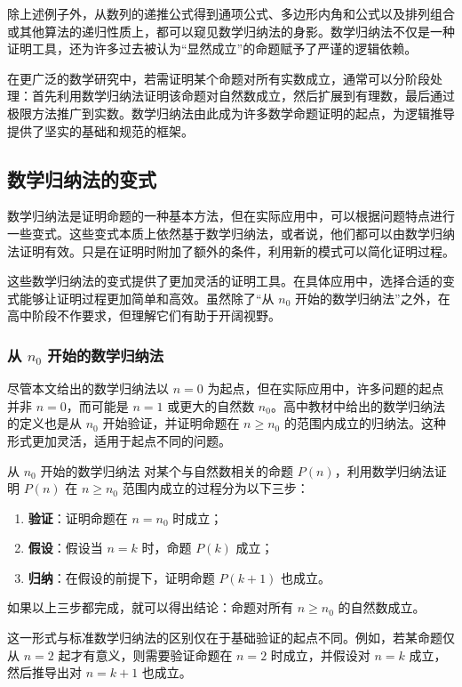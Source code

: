 除上述例子外，从数列的递推公式得到通项公式、多边形内角和公式以及排列组合或其他算法的递归性质上，都可以窥见数学归纳法的身影。数学归纳法不仅是一种证明工具，还为许多过去被认为“显然成立”的命题赋予了严谨的逻辑依赖。

在更广泛的数学研究中，若需证明某个命题对所有实数成立，通常可以分阶段处理：首先利用数学归纳法证明该命题对自然数成立，然后扩展到有理数，最后通过极限方法推广到实数。数学归纳法由此成为许多数学命题证明的起点，为逻辑推导提供了坚实的基础和规范的框架。

\subsection{数学归纳法的变式}

数学归纳法是证明命题的一种基本方法，但在实际应用中，可以根据问题特点进行一些变式。这些变式本质上依然基于数学归纳法，或者说，他们都可以由数学归纳法证明有效。只是在证明时附加了额外的条件，利用新的模式可以简化证明过程。

这些数学归纳法的变式提供了更加灵活的证明工具。在具体应用中，选择合适的变式能够让证明过程更加简单和高效。虽然除了“从 $n_0$ 开始的数学归纳法”之外，在高中阶段不作要求，但理解它们有助于开阔视野。

\subsubsection{从 $n_0$ 开始的数学归纳法}

尽管本文给出的数学归纳法以 $n = 0$ 为起点，但在实际应用中，许多问题的起点并非 $n = 0$，而可能是 $n = 1$ 或更大的自然数 $n_0$。高中教材中给出的数学归纳法的定义也是从 $n_0$ 开始验证，并证明命题在 $n \geq n_0$ 的范围内成立的归纳法。这种形式更加灵活，适用于起点不同的问题。

\begin{definition}{从 $n_0$ 开始的数学归纳法}
对某个与自然数相关的命题 $P(n)$，利用数学归纳法证明 $P(n)$ 在 $n \geq n_0$ 范围内成立的过程分为以下三步：
\begin{enumerate}
\item \textbf{验证}：证明命题在 $n = n_0$ 时成立；
\item \textbf{假设}：假设当 $n = k$ 时，命题 $P(k)$ 成立；
\item \textbf{归纳}：在假设的前提下，证明命题 $P(k+1)$ 也成立。
\end{enumerate}
如果以上三步都完成，就可以得出结论：命题对所有 $n \geq n_0$ 的自然数成立。
\end{definition}

这一形式与标准数学归纳法的区别仅在于基础验证的起点不同。例如，若某命题仅从 $n = 2$ 起才有意义，则需要验证命题在 $n = 2$ 时成立，并假设对 $n = k$ 成立，然后推导出对 $n = k+1$ 也成立。

